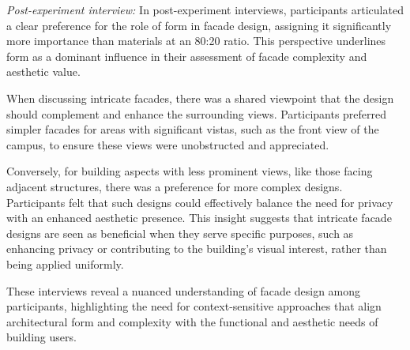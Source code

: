 \textit{Post-experiment interview:}
In post-experiment interviews, participants articulated a clear preference for the role of form in facade design, assigning it significantly more importance than materials at an 80:20 ratio.
This perspective underlines form as a dominant influence in their assessment of facade complexity and aesthetic value.

When discussing intricate facades, there was a shared viewpoint that the design should complement and enhance the surrounding views.
Participants preferred simpler facades for areas with significant vistas, such as the front view of the campus, to ensure these views were unobstructed and appreciated.

Conversely, for building aspects with less prominent views, like those facing adjacent structures, there was a preference for more complex designs.
Participants felt that such designs could effectively balance the need for privacy with an enhanced aesthetic presence.
This insight suggests that intricate facade designs are seen as beneficial when they serve specific purposes, such as enhancing privacy or contributing to the building’s visual interest, rather than being applied uniformly.

These interviews reveal a nuanced understanding of facade design among participants, highlighting the need for context-sensitive approaches that align architectural form and complexity with the functional and aesthetic needs of building users.











